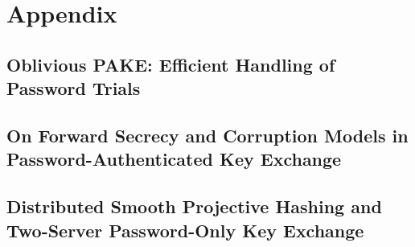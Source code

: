 \cleardoublepage
\part*{Appendix}
\chapter{Oblivious PAKE: Efficient Handling of Password Trials}\label{paper:opake}


\chapter{On Forward Secrecy and Corruption Models in Password-Authenticated Key Exchange}\label{paper:corrupt}


\chapter{Distributed Smooth Projective Hashing and Two-Server Password-Only Key Exchange}\label{paper:2pake}


